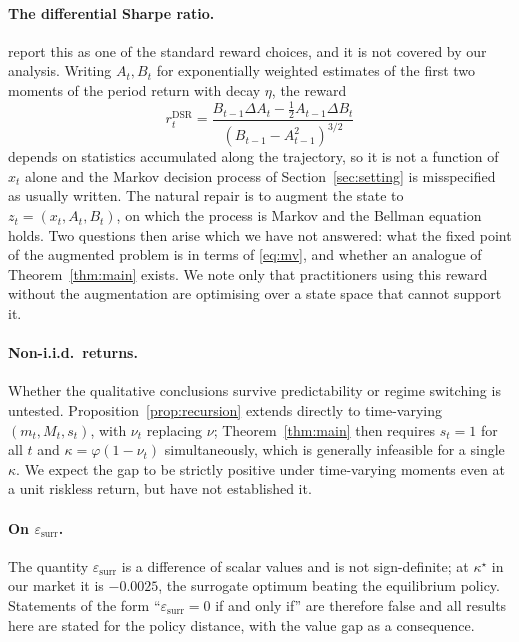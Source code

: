 \documentclass[11pt,a4paper]{article}
\theoremstyle{plain}
\theoremstyle{definition}
\theoremstyle{remark}
\newcommand{\epssurr}{\varepsilon_{\mathrm{surr}}}
\begin{document}
\paragraph{The differential Sharpe ratio.} \citet{hambly} report this as one of
the standard reward choices, and it is not covered by our analysis. Writing
$A_t,B_t$ for exponentially weighted estimates of the first two moments of the
period return with decay $\eta$, the reward
\[
r_t^{\mathrm{DSR}}=\frac{B_{t-1}\Delta A_t-\tfrac12A_{t-1}\Delta B_t}
{(B_{t-1}-A_{t-1}^{2})^{3/2}}
\]
depends on statistics accumulated along the trajectory, so it is not a function
of $x_t$ alone and the Markov decision process of Section~\ref{sec:setting} is
misspecified as usually written. The natural repair is to augment the state to
$z_t=(x_t,A_t,B_t)$, on which the process is Markov and the Bellman equation
holds. Two questions then arise which we have not answered: what the fixed point
of the augmented problem is in terms of \eqref{eq:mv}, and whether an analogue of
Theorem~\ref{thm:main} exists. We note only that practitioners using this reward
without the augmentation are optimising over a state space that cannot support
it.

\paragraph{Non-i.i.d.\ returns.} Whether the qualitative conclusions survive
predictability or regime switching is untested. Proposition~\ref{prop:recursion}
extends directly to time-varying $(m_t,M_t,s_t)$, with $\nu_t$ replacing $\nu$;
Theorem~\ref{thm:main} then requires $s_t=1$ for all $t$ and
$\kappa=\varphi(1-\nu_t)$ simultaneously, which is generally infeasible for a
single $\kappa$. We expect the gap to be strictly positive under time-varying
moments even at a unit riskless return, but have not established it.

\paragraph{On $\epssurr$.} The quantity $\epssurr$ is a difference of scalar
values and is not sign-definite; at $\kappa^{\star}$ in our market it is
$-0.0025$, the surrogate optimum beating the equilibrium policy. Statements of
the form ``$\epssurr=0$ if and only if'' are therefore false and all results here
are stated for the policy distance, with the value gap as a consequence.

\end{document}
